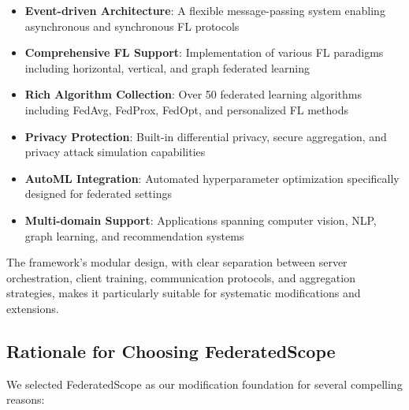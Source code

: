 \documentclass[11pt,conference]{article}
\begin{document}
\begin{itemize}
    \item \textbf{Event-driven Architecture}: A flexible message-passing system enabling asynchronous and synchronous FL protocols
    \item \textbf{Comprehensive FL Support}: Implementation of various FL paradigms including horizontal, vertical, and graph federated learning
    \item \textbf{Rich Algorithm Collection}: Over 50 federated learning algorithms including FedAvg, FedProx, FedOpt, and personalized FL methods
    \item \textbf{Privacy Protection}: Built-in differential privacy, secure aggregation, and privacy attack simulation capabilities
    \item \textbf{AutoML Integration}: Automated hyperparameter optimization specifically designed for federated settings
    \item \textbf{Multi-domain Support}: Applications spanning computer vision, NLP, graph learning, and recommendation systems
\end{itemize}

The framework's modular design, with clear separation between server orchestration, client training, communication protocols, and aggregation strategies, makes it particularly suitable for systematic modifications and extensions.

\subsection{Rationale for Choosing FederatedScope}

We selected FederatedScope as our modification foundation for several compelling reasons:
\end{document}
